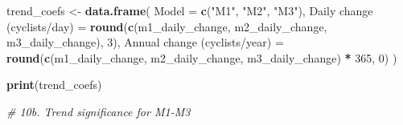 \documentclass[
]{article}
\newenvironment{Shaded}{\begin{snugshade}}{\end{snugshade}}
\newcommand{\AttributeTok}[1]{\textcolor[rgb]{0.13,0.29,0.53}{#1}}
\newcommand{\CommentTok}[1]{\textcolor[rgb]{0.56,0.35,0.01}{\textit{#1}}}
\newcommand{\DecValTok}[1]{\textcolor[rgb]{0.00,0.00,0.81}{#1}}
\newcommand{\FunctionTok}[1]{\textcolor[rgb]{0.13,0.29,0.53}{\textbf{#1}}}
\newcommand{\NormalTok}[1]{#1}
\newcommand{\OtherTok}[1]{\textcolor[rgb]{0.56,0.35,0.01}{#1}}
\newcommand{\SpecialCharTok}[1]{\textcolor[rgb]{0.81,0.36,0.00}{\textbf{#1}}}
\newcommand{\StringTok}[1]{\textcolor[rgb]{0.31,0.60,0.02}{#1}}
\begin{document}
\begin{Shaded}
\begin{Highlighting}[]
\NormalTok{trend\_coefs }\OtherTok{\textless{}{-}} \FunctionTok{data.frame}\NormalTok{(}
  \AttributeTok{Model =} \FunctionTok{c}\NormalTok{(}\StringTok{"M1"}\NormalTok{, }\StringTok{"M2"}\NormalTok{, }\StringTok{"M3"}\NormalTok{),}
  \StringTok{\textasciigrave{}}\AttributeTok{Daily change (cyclists/day)}\StringTok{\textasciigrave{}} \OtherTok{=} \FunctionTok{round}\NormalTok{(}\FunctionTok{c}\NormalTok{(m1\_daily\_change, m2\_daily\_change, m3\_daily\_change), }\DecValTok{3}\NormalTok{),}
  \StringTok{\textasciigrave{}}\AttributeTok{Annual change (cyclists/year)}\StringTok{\textasciigrave{}} \OtherTok{=} \FunctionTok{round}\NormalTok{(}\FunctionTok{c}\NormalTok{(m1\_daily\_change, m2\_daily\_change, m3\_daily\_change) }\SpecialCharTok{*} \DecValTok{365}\NormalTok{, }\DecValTok{0}\NormalTok{)}
\NormalTok{)}

\FunctionTok{print}\NormalTok{(trend\_coefs)}

\CommentTok{\# 10b. Trend significance for M1{-}M3}


\end{Highlighting}
\end{Shaded}
\end{document}
